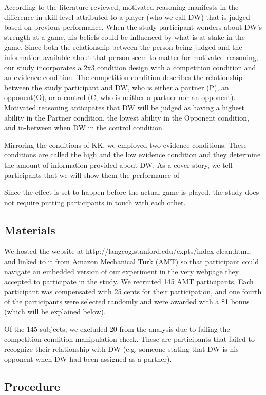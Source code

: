 \documentclass{article}
\begin{document}
According to the literature reviewed, motivated reasoning manifests in the difference in skill level attributed to a player (who we call DW) that is judged based on previous performance. When the study participant wonders about DW's strength at a game, his beliefs could be influenced by what is at stake in the game. Since both the relationship between the person being judged and the information available about that person seem to matter for motivated reasoning, our study incorporates a 2x3 condition design with a competition condition and an evidence condition. The competition condition describes the relationship between the study participant and DW, who is either a partner (P), an opponent(O), or a control (C, who is neither a partner nor an opponent). Motivated reasoning anticipates that DW will be judged as having a highest ability in the Partner condition, the lowest ability in the Opponent condition, and in-between when DW in the control condition. 

Mirroring the conditions of KK, we employed two evidence conditions. These conditions are called the high and the low evidence condition and they determine the amount of information provided about DW. As a cover story, we tell participants that we will show them the performance of

Since the effect is set to happen before the actual game is played, the study does not require putting participants in touch with each other.

\subsection{Materials}

We hosted the website at http://langcog.stanford.edu/expts/index-clean.html, and linked to it from Amazon Mechanical Turk (AMT) so that participant could navigate an embedded version of our experiment in the very webpage they accepted to participate in the study. We recruited 145 AMT participants. Each participant was compensated with 25 cents for their participation, and one fourth of the participants were selected randomly and were awarded with a \$1 bonus (which will be explained below).

Of the 145 subjects, we excluded 20 from the analysis due to failing the competition condition manipulation check. These are participants that failed to recognize their relationship with DW (e.g. someone stating that DW is his opponent when DW had been assigned as a partner).


\subsection{Procedure}
\end{document}
